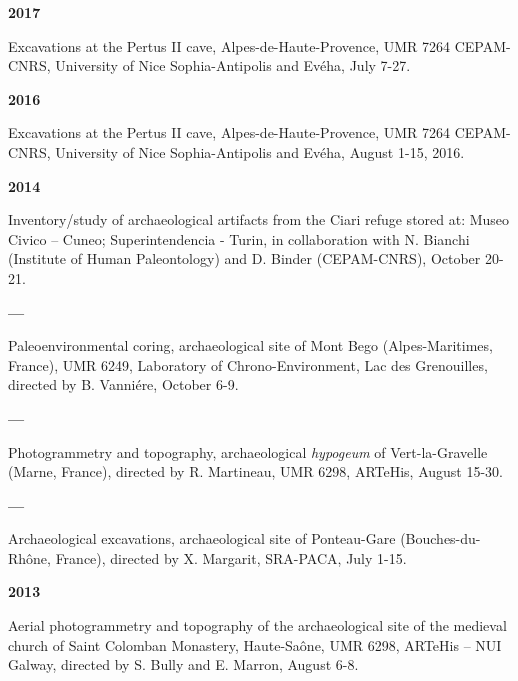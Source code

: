 \documentclass{article}
\newcommand{\fr}[1]{}       %
\newcommand{\en}[1]{#1}     %
\begin{document}
\smallbreak
\textbf{2017}
\fr{Fouilles de la grotte de Pertus II, Alpes-de-Haute-Provence, UMR 7264 CEPAM-CNRS, Université Nice Sophia-Antipolis et Evéha, 7-27 juillet.}
\en{Excavations at the Pertus II cave, Alpes-de-Haute-Provence, UMR 7264 CEPAM-CNRS, University of Nice Sophia-Antipolis and Evéha, July 7-27.}

\smallbreak
\textbf{2016}
\fr{Fouilles de la grotte de Pertus II, Alpes-de-Haute-Provence, UMR 7264 CEPAM-CNRS, Université Nice Sophia-Antipolis et Evéha, 1-15 août 2016.}
\en{Excavations at the Pertus II cave, Alpes-de-Haute-Provence, UMR 7264 CEPAM-CNRS, University of Nice Sophia-Antipolis and Evéha, August 1-15, 2016.}

\smallbreak
\textbf{2014}
\fr{Inventaire/étude des artefacts archéologiques du refuge de Ciari conservés au: Museo Civico -- Cuneo ; Superintendencia - Turin, en collaboration avec N. Bianchi (Institut de Paléontologie Humaine) et D. Binder (CEPAM-CNRS), 20-21 octobre.}
\en{Inventory/study of archaeological artifacts from the Ciari refuge stored at: Museo Civico -- Cuneo; Superintendencia - Turin, in collaboration with N. Bianchi (Institute of Human Paleontology) and D. Binder (CEPAM-CNRS), October 20-21.}

\smallbreak
\textbf{--- }
\fr{Carottage paléoenvironnemental, site archéologique du mont Bego (Alpes-Maritimes, France), UMR 6249, Laboratoire Chrono-Environnement, Lac des Grenouilles, dir. B. Vanniére, 6-9 octobre.}
\en{Paleoenvironmental coring, archaeological site of Mont Bego (Alpes-Maritimes, France), UMR 6249, Laboratory of Chrono-Environment, Lac des Grenouilles, directed by B. Vanniére, October 6-9.}

\smallbreak
\textbf{--- }
\fr{Photogrammétrie et topographie, \textit{hypogée} archéologique de Vert-la-Gravelle (Marne, France), dir. R. Martineau, UMR 6298, ARTeHis, 15-30 août.}
\en{Photogrammetry and topography, archaeological \textit{hypogeum} of Vert-la-Gravelle (Marne, France), directed by R. Martineau, UMR 6298, ARTeHis, August 15-30.}

\smallbreak
\textbf{---}
\fr{Fouilles archéologiques, site archéologique de Ponteau-Gare (Bouches-du-Rhône, France), dir. X. Margarit, SRA-PACA, 1-15 juillet.}
\en{Archaeological excavations, archaeological site of Ponteau-Gare (Bouches-du-Rhône, France), directed by X. Margarit, SRA-PACA, July 1-15.}

\smallbreak
\textbf{2013}
\fr{Photogrammétrie aérienne et topographie du site archéologique de l'église médiévale du monastère de Saint Colomban, Haute-Saône, UMR 6298, ARTeHis -- NUI Galway, dir. S. Bully et E. Marron, 6-8 août.}
\en{Aerial photogrammetry and topography of the archaeological site of the medieval church of Saint Colomban Monastery, Haute-Saône, UMR 6298, ARTeHis -- NUI Galway, directed by S. Bully and E. Marron, August 6-8.}
\end{document}
